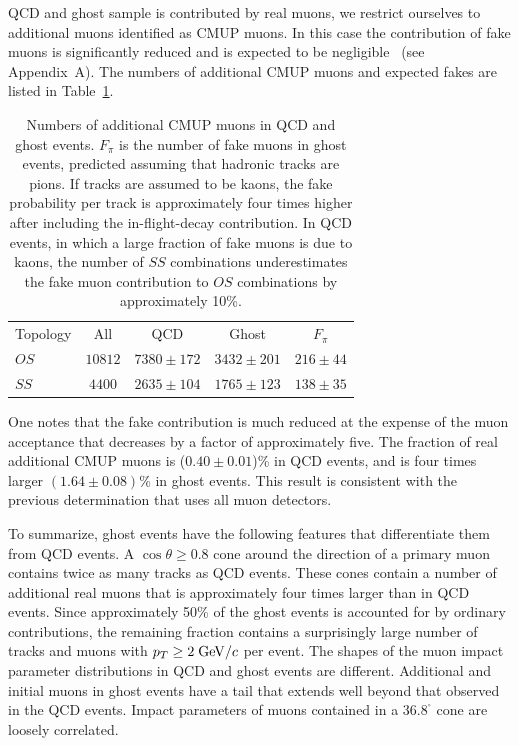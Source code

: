 \documentclass[aps,prd,preprint,floatfix,nofootinbib,superscriptaddress,showpacs,amssymb]{revtex4}
\def\deg{^\circ}
\begin{document}
QCD and ghost sample is contributed by real muons, we restrict
ourselves to additional muons identified as CMUP muons.   In this case the
contribution of fake muons is significantly reduced and is expected to be 
negligible~\cite{bbxs} (see Appendix~A).
 The numbers of additional CMUP muons and expected
 fakes are listed in Table~\ref{tab:tab_7bis}.
 \begin{table}
 \caption[]{Numbers of additional CMUP muons in QCD and ghost events. $F_\pi$
            is the number of fake muons in ghost events, predicted assuming 
            that hadronic tracks are pions. If tracks are assumed to be kaons,
            the fake probability per track is approximately four times higher
            after including the in-flight-decay contribution. In
            QCD events, in which a large fraction of fake muons is due to kaons,
            the number of $SS$ 
            combinations underestimates the fake muon contribution
            to $OS$ combinations by approximately 10\%.}
 \begin{center}
 \begin{ruledtabular}
 \begin{tabular}{lcccc}
  Topology &  All     & QCD            &     Ghost     &    $F_\pi$   \\
  $OS$     &  $10812$ & $7380\pm 172$  &  $3432\pm 201$&  $216\pm 44$ \\
  $SS$     &  $4400$  & $2635\pm 104$  &  $1765\pm 123$&  $138\pm 35$ \\
 \end{tabular}
 \end{ruledtabular}
 \end{center}
 \label{tab:tab_7bis}
 \end{table} 
 One notes that the fake contribution is much reduced at the expense
 of the muon acceptance that decreases by a factor of approximately five.
 The fraction of real additional CMUP muons is ($0.40\pm0.01$)\% in QCD
 events, and is four times larger $(1.64 \pm 0.08) $\% in ghost events. 
 This result is consistent with the previous determination that uses all
 muon detectors.
 
 To summarize, ghost events have the following features that differentiate
 them from QCD events. A $\cos \theta \geq 0.8$ cone around the direction
 of a primary muon contains twice as many tracks as QCD events. These cones  
 contain a number of additional real muons that is approximately four times
 larger than in QCD events. Since approximately 50\% of the ghost events 
 is accounted for by ordinary contributions, the remaining fraction
 contains a surprisingly large number of tracks and muons with
 $p_T \geq 2 \; {\rm GeV/}c$ per event. The shapes of the muon impact parameter
 distributions in QCD and ghost events are different. Additional and 
 initial muons in ghost events  have a tail that extends well
 beyond that observed in the QCD events. Impact parameters of muons
 contained in a 36.8$^{\deg}$ cone are loosely correlated.
 
\end{document}
